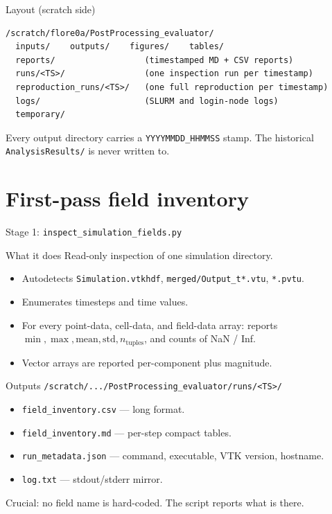 \documentclass[aspectratio=169]{beamer}
\begin{document}
\begin{frame}[fragile]{Layout (scratch side)}
\small
\begin{verbatim}
/scratch/flore0a/PostProcessing_evaluator/
  inputs/    outputs/    figures/    tables/
  reports/                  (timestamped MD + CSV reports)
  runs/<TS>/                (one inspection run per timestamp)
  reproduction_runs/<TS>/   (one full reproduction per timestamp)
  logs/                     (SLURM and login-node logs)
  temporary/
\end{verbatim}

Every output directory carries a \texttt{YYYYMMDD\_HHMMSS} stamp.
The historical \texttt{AnalysisResults/} is never written to.
\end{frame}

\section{First-pass field inventory}

\begin{frame}{Stage 1: \texttt{inspect\_simulation\_fields.py}}
\begin{block}{What it does}
Read-only inspection of one simulation directory.
\begin{itemize}
  \item Autodetects \texttt{Simulation.vtkhdf}, \texttt{merged/Output\_t*.vtu},
        \texttt{*.pvtu}.
  \item Enumerates timesteps and time values.
  \item For every point-data, cell-data, and field-data array: reports
        \(\min, \max, \text{mean}, \text{std}, n_{\text{tuples}}\), and
        counts of NaN / Inf.
  \item Vector arrays are reported per-component plus magnitude.
\end{itemize}
\end{block}

\begin{block}{Outputs}
\texttt{/scratch/.../PostProcessing\_evaluator/runs/<TS>/}
\begin{itemize}
  \item \texttt{field\_inventory.csv} --- long format.
  \item \texttt{field\_inventory.md} --- per-step compact tables.
  \item \texttt{run\_metadata.json} --- command, executable, VTK version, hostname.
  \item \texttt{log.txt} --- stdout/stderr mirror.
\end{itemize}
\end{block}

\textcolor{info}{Crucial: no field name is hard-coded. The script reports what is there.}
\end{frame}
\end{document}
